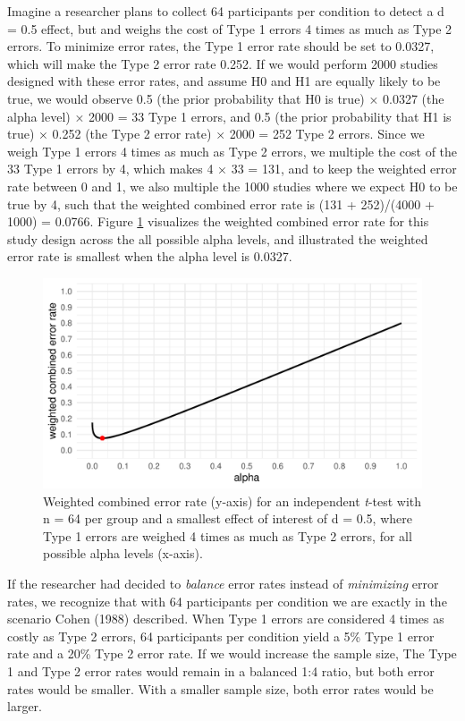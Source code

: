 \documentclass[
  english,
  ,jou, a4paper,floatsintext]{apa6}
\begin{document}
Imagine a researcher plans to collect 64 participants per condition to detect a d = 0.5 effect, but and weighs the cost of Type 1 errors 4 times as much as Type 2 errors. To minimize error rates, the Type 1 error rate should be set to 0.0327, which will make the Type 2 error rate 0.252. If we would perform 2000 studies designed with these error rates, and assume H0 and H1 are equally likely to be true, we would observe 0.5 (the prior probability that H0 is true) × 0.0327 (the alpha level) × 2000 = 33 Type 1 errors, and 0.5 (the prior probability that H1 is true) × 0.252 (the Type 2 error rate) × 2000 = 252 Type 2 errors. Since we weigh Type 1 errors 4 times as much as Type 2 errors, we multiple the cost of the 33 Type 1 errors by 4, which makes 4 × 33 = 131, and to keep the weighted error rate between 0 and 1, we also multiple the 1000 studies where we expect H0 to be true by 4, such that the weighted combined error rate is (131 + 252)/(4000 + 1000) = 0.0766. Figure \ref{fig:cost-plot} visualizes the weighted combined error rate for this study design across the all possible alpha levels, and illustrated the weighted error rate is smallest when the alpha level is 0.0327.

\begin{figure}
\centering
\includegraphics{Justify_in_Practice_files/figure-latex/cost-plot-1.pdf}
\caption{\label{fig:cost-plot}Weighted combined error rate (y-axis) for an independent \emph{t}-test with n = 64 per group and a smallest effect of interest of d = 0.5, where Type 1 errors are weighed 4 times as much as Type 2 errors, for all possible alpha levels (x-axis).}
\end{figure}

If the researcher had decided to \emph{balance} error rates instead of \emph{minimizing} error rates, we recognize that with 64 participants per condition we are exactly in the scenario Cohen (1988) described. When Type 1 errors are considered 4 times as costly as Type 2 errors, 64 participants per condition yield a 5\% Type 1 error rate and a 20\% Type 2 error rate. If we would increase the sample size, The Type 1 and Type 2 error rates would remain in a balanced 1:4 ratio, but both error rates would be smaller. With a smaller sample size, both error rates would be larger.
\end{document}
